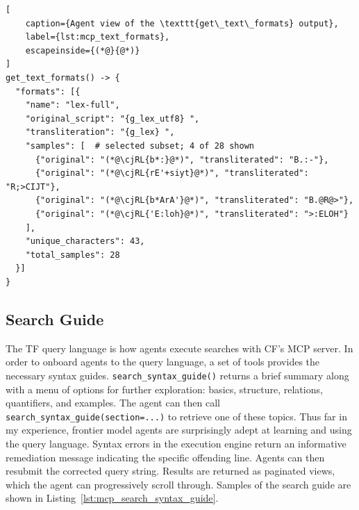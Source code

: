 \documentclass[11pt,a4paper]{article}
\begin{document}
\begin{lstlisting}[
    caption={Agent view of the \texttt{get\_text\_formats} output},
    label={lst:mcp_text_formats},
    escapeinside={(*@}{@*)}
]
get_text_formats() -> {
  "formats": [{
    "name": "lex-full",
    "original_script": "{g_lex_utf8} ",
    "transliteration": "{g_lex} ",
    "samples": [  # selected subset; 4 of 28 shown
      {"original": "(*@\cjRL{b*:}@*)", "transliterated": "B.:-"},
      {"original": "(*@\cjRL{rE'+siyt}@*)", "transliterated": "R;>CIJT"},
      {"original": "(*@\cjRL{b*ArA'}@*)", "transliterated": "B.@R@>"},
      {"original": "(*@\cjRL{'E:loh}@*)", "transliterated": ">:ELOH"}
    ],
    "unique_characters": 43,
    "total_samples": 28
  }]
}
\end{lstlisting}

\subsection{Search Guide}

The TF query language is how agents execute searches with CF's MCP server.
In order to onboard agents to the query language, a set of tools provides the necessary
syntax guides. \texttt{search\_syntax\_guide()} returns a brief summary along with a menu
of options for further exploration: basics, structure, relations, quantifiers, and examples.
The agent can then call \texttt{search\_syntax\_guide(section=...)} to retrieve one of these
topics. Thus far in my experience, frontier model agents are surprisingly adept at learning
and using the query language.
Syntax errors in the execution engine return an informative remediation message indicating
the specific offending line. Agents can then resubmit the corrected query string. Results are
returned as paginated views, which the agent can progressively scroll through.
Samples of the search guide are shown in Listing~\ref{lst:mcp_search_syntax_guide}.
\end{document}
